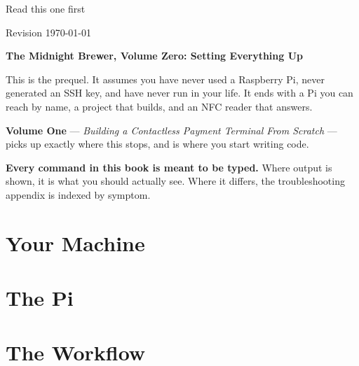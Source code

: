 \documentclass[11pt,twoside,openright]{book}
\begin{document}
\begin{titlepage}
\vfill
{\sffamily\small\color{brewergrey}
 Read this one first\par}
\vspace{6pt}
{\sffamily\footnotesize\color{brewergrey} Revision \today\par}
\end{titlepage}

\cleardoublepage
\thispagestyle{empty}
\vspace*{\fill}
{\small
\textbf{The Midnight Brewer, Volume Zero: Setting Everything Up}\par
\vspace{8pt}
This is the prequel. It assumes you have never used a Raspberry Pi, never
generated an SSH key, and have never run  in your life. It ends with a
Pi you can reach by name, a project that builds, and an NFC reader that
answers.\par
\vspace{10pt}
\textbf{Volume One} --- \emph{Building a Contactless Payment Terminal From
Scratch} --- picks up exactly where this stops, and is where you start writing
code.\par
\vspace{10pt}
\textbf{Every command in this book is meant to be typed.} Where output is shown,
it is what you should actually see. Where it differs, the troubleshooting
appendix is indexed by symptom.\par
}
\vspace*{\fill}

\cleardoublepage
\tableofcontents

\cleardoublepage


\mainmatter

\part{Your Machine}




\part{The Pi}





\part{The Workflow}




\end{document}
